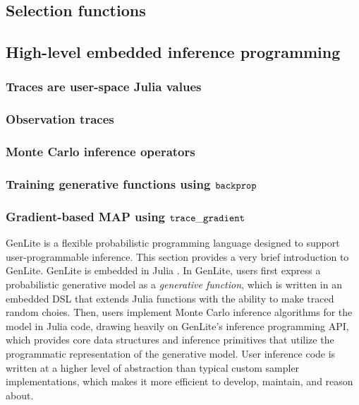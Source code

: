 \subsection{Selection functions}

\subsection{High-level embedded inference programming}

\subsubsection{Traces are user-space Julia values}

\subsubsection{Observation traces}

\subsubsection{Monte Carlo inference operators}



\subsubsection{Training generative functions using $\mathtt{backprop}{}$} \label{sec:training}

\subsubsection{Gradient-based MAP using $\mathtt{trace\_gradient}{}$}

GenLite \cite{TODO} is a flexible probabilistic programming language designed to support user-programmable inference.
This section provides a very brief introduction to GenLite.
GenLite is embedded in Julia \cite{TODO}.
In GenLite, users first express a probabilistic generative model as a \emph{generative function}, which is written in an embedded DSL that extends Julia functions with the ability to make traced random choies.
Then, users implement Monte Carlo inference algorithms for the model in Julia code, drawing heavily on GenLite's inference programming API, which provides core data structures and inference primitives that utilize the programmatic representation of the generative model.
User inference code is written at a higher level of abstraction than typical custom sampler implementations, which makes it more efficient to develop, maintain, and reason about.

